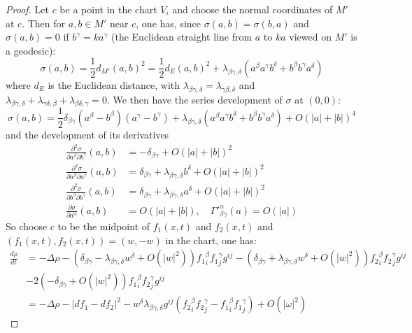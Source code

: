 \begin{proof}
Let \(c\) be a point in the chart \(V_i\) and choose the normal coordinates of \(M'\) at \(c\). Then for \(a,b\in M'\) near \(c\), one has, since \(\sigma(a,b) =
\sigma(b,a)\) and \(\sigma(a,b)=0\) if \(b^\gamma = k a^\gamma\) (the Euclidean
straight line from \(a\) to \(ka\) viewed on \(M'\) is a geodesic):
\[
 \sigma(a,b) = \frac{1}{2}d_{M'}(a,b)^2 = \frac{1}{2}d_E(a,b)^2 +
\lambda_{\beta\gamma,\delta}(a^\beta a^\gamma b^\delta + b^\beta b^\gamma a^\delta)
\]
where \(d_E\) is the Euclidean distance, with \(\lambda_{\beta\gamma,\delta} =
\lambda_{\gamma\beta,\delta}\) and \(\lambda_{\beta\gamma,\delta}
+\lambda_{\gamma\delta,\beta} + \lambda_{\beta\delta,\gamma}= 0\). We then have the
series development of \(\sigma\) at \((0,0)\):
\begin{equation}
\label{eq:dev-sig-unique}
\sigma(a,b) = \frac{1}{2}\delta_{\beta\gamma} (a^\beta - b^\beta)(a^\gamma - b^\gamma) +
\lambda_{\beta\gamma,\delta} (a^\beta a^\gamma b^\delta + b^\beta b^\gamma a^\delta) + O(|a|+|b|)^4
\end{equation}
and the development of its derivatives
\begin{align*}
  \frac{\partial^2 \sigma}{\partial a^\beta \partial b^\gamma}(a,b) &= -\delta_{\beta\gamma} + O(|a|+|b|)^2\\
  \frac{\partial^2 \sigma}{\partial a^\beta \partial a^\gamma}(a,b) &= \delta_{\beta\gamma} + \lambda_{\beta\gamma,\delta}b^\delta + O(|a|+|b|)^2\\
  \frac{\partial^2 \sigma}{\partial b^\beta \partial b^\gamma}(a,b) &= \delta_{\beta\gamma} + \lambda_{\beta\gamma,\delta}a^\delta + O(|a|+|b|)^2\\
   \frac{\partial\sigma}{\partial a^\alpha}(a,b) &= O(|a|+|b|),\quad {\Gamma'}^\alpha_{\beta\gamma}(a) = O(|a|)
\end{align*}
So choose \(c\) to be the midpoint of \(f_1(x,t)\) and \(f_2(x,t)\) and \((f_1(x,t),
f_2(x,t)) = (w,-w)\) in the chart, one has:
\begin{align}
 \frac{d\rho}{d t} &= -\Delta\rho - \left( \delta_{\beta\gamma} -\lambda_{\beta\gamma,\delta}w^\delta + O(|w|^2)  \right) {f_1}^\beta_i {f_1}^\gamma_j g^{ij}   - \left( \delta_{\beta\gamma} + \lambda_{\beta\gamma,\delta} w^\delta + O(|w|^2)\right) {f_2}^\beta_i {f_2}^\gamma_j g^{ij}  \label{eq:sym-red-beta-before}\\
		   & - 2\left( -\delta_{\beta\gamma} + O(|w|^2)  \right) {f_1}^\beta_i {f_2}^\gamma_j g^{ij} \label{eq:sym-red-beta}\\
		   & = -\Delta \rho - |df_1 -df_2|^2 - w^\delta \lambda_{\beta\gamma,\delta}g^{ij}\left(  {f_2}^\beta_i {f_2}^\gamma_j - {f_1}^\beta_i {f_1}^\gamma_j  \right) + O(|\omega|^2) \label{eq:first-order-w}

\end{align}
\end{proof}
